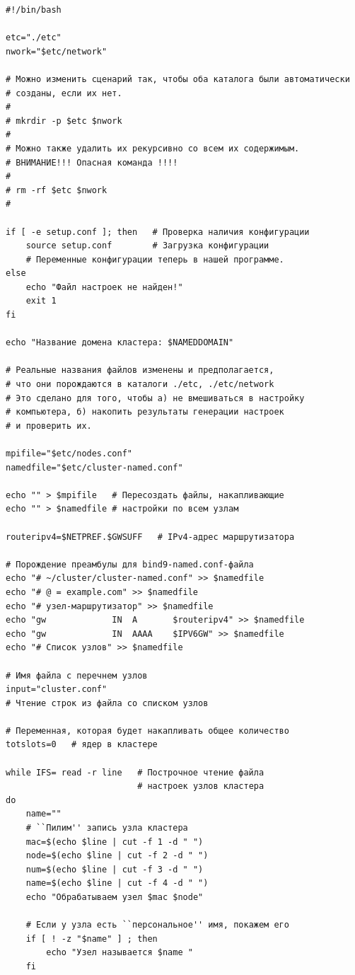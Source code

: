 \documentclass[12pt]{article}
\begin{document}
\begin{verbatim}
#!/bin/bash

etc="./etc"
nwork="$etc/network"

# Можно изменить сценарий так, чтобы оба каталога были автоматически
# созданы, если их нет.
#
# mkrdir -p $etc $nwork
#
# Можно также удалить их рекурсивно со всем их содержимым.
# ВНИМАНИЕ!!! Опасная команда !!!!
#
# rm -rf $etc $nwork
#

if [ -e setup.conf ]; then   # Проверка наличия конфигурации
    source setup.conf        # Загрузка конфигурации
    # Переменные конфигурации теперь в нашей программе.
else
    echo "Файл настроек не найден!"
    exit 1
fi

echo "Название домена кластера: $NAMEDDOMAIN"

# Реальные названия файлов изменены и предполагается,
# что они порождаются в каталоги ./etc, ./etc/network
# Это сделано для того, чтобы а) не вмешиваться в настройку
# компьютера, б) накопить результаты генерации настроек
# и проверить их.

mpifile="$etc/nodes.conf"
namedfile="$etc/cluster-named.conf"

echo "" > $mpifile   # Пересоздать файлы, накапливающие
echo "" > $namedfile # настройки по всем узлам

routeripv4=$NETPREF.$GWSUFF   # IPv4-адрес маршрутизатора

# Порождение преамбулы для bind9-named.conf-файла
echo "# ~/cluster/cluster-named.conf" >> $namedfile
echo "# @ = example.com" >> $namedfile
echo "# узел-маршрутизатор" >> $namedfile
echo "gw             IN  A       $routeripv4" >> $namedfile
echo "gw             IN  AAAA    $IPV6GW" >> $namedfile
echo "# Список узлов" >> $namedfile

# Имя файла с перечнем узлов
input="cluster.conf"
# Чтение строк из файла со списком узлов

# Переменная, которая будет накапливать общее количество
totslots=0   # ядер в кластере

while IFS= read -r line   # Построчное чтение файла
                          # настроек узлов кластера
do
    name=""
    # ``Пилим'' запись узла кластера
    mac=$(echo $line | cut -f 1 -d " ")
    node=$(echo $line | cut -f 2 -d " ")
    num=$(echo $line | cut -f 3 -d " ")
    name=$(echo $line | cut -f 4 -d " ")
    echo "Обрабатываем узел $mac $node"

    # Если у узла есть ``персональное'' имя, покажем его
    if [ ! -z "$name" ] ; then
        echo "Узел называется $name "
    fi


\end{verbatim}
\end{document}
